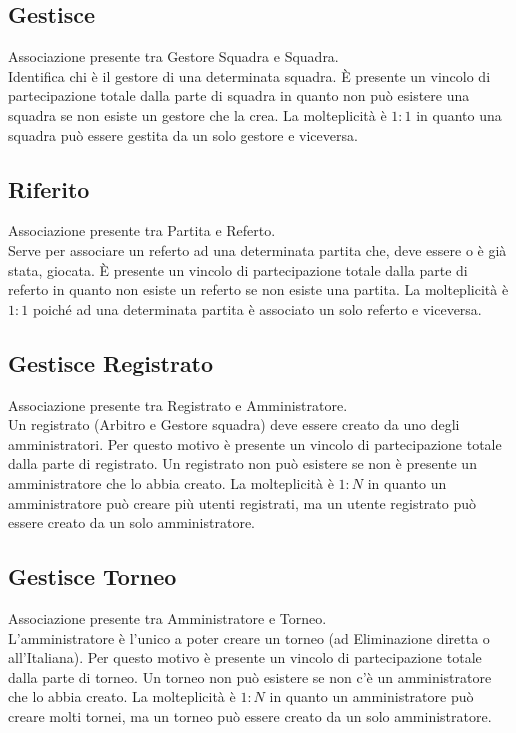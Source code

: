 	\subsection{Gestisce}
	Associazione presente tra Gestore Squadra e Squadra. \\
	Identifica chi è il gestore di una determinata squadra. È presente un vincolo di partecipazione totale dalla parte di squadra in quanto non può esistere una squadra se non esiste un gestore che la crea.
	La molteplicità è $1:1$ in quanto una squadra può essere gestita da un solo gestore e viceversa.
	
	\subsection{Riferito}
	Associazione presente tra Partita e Referto. \\
	Serve per associare un referto ad una determinata partita che, deve essere o è già stata, giocata.
	È presente un vincolo di partecipazione totale dalla parte di referto in quanto non esiste un referto se non esiste una partita. 
	La molteplicità è $1:1$ poiché ad una determinata partita è associato un solo referto e viceversa.
	
	\subsection{Gestisce Registrato}
	Associazione presente tra Registrato e Amministratore. \\
	Un registrato (Arbitro e Gestore squadra) deve essere creato da uno degli amministratori. Per questo motivo è presente un vincolo di partecipazione totale dalla parte di registrato. Un registrato non può esistere se non è presente un amministratore che lo abbia creato.
	La molteplicità è $1:N$ in quanto un amministratore può creare più utenti registrati, ma un utente registrato può essere creato da un solo amministratore.
	
	\subsection{Gestisce Torneo}
	Associazione presente tra Amministratore e Torneo. \\
	L’amministratore è l’unico a poter creare un torneo (ad Eliminazione diretta o all'Italiana). Per questo motivo è presente un vincolo di partecipazione totale dalla parte di torneo. Un torneo non può esistere se non c’è un amministratore che lo abbia creato.
	La molteplicità è $1:N$ in quanto un amministratore può creare molti tornei, ma un torneo può essere creato da un solo amministratore.
	
